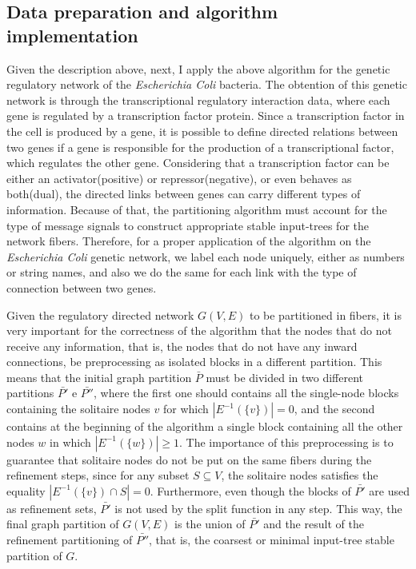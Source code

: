 \documentclass[12pt]{diazessay} %
\begin{document}

\subsection{Data preparation and algorithm implementation}

Given the description above, next, I apply the above algorithm for the genetic regulatory network of the \textit{Escherichia Coli} bacteria. The obtention of this genetic network is through the transcriptional regulatory interaction data, where each gene is regulated by a transcription factor protein. Since a transcription factor in the cell is produced by a gene, it is possible to define directed relations between two genes if a gene is responsible for the production of a transcriptional factor, which regulates the other gene. Considering that a transcription factor can be either an activator(positive) or repressor(negative), or even behaves as both(dual), the directed links between genes can carry different types of information. Because of that, the partitioning algorithm must account for the type of message signals to construct appropriate stable input-trees for the network fibers. Therefore, for a proper application of the algorithm on the \textit{Escherichia Coli} genetic network, we label each node uniquely, either as numbers or string names, and also we do the same for each link with the type of connection between two genes.

Given the regulatory directed network $G(V, E)$ to be partitioned in fibers, it is very important for the correctness of the algorithm that the nodes that do not receive any information, that is, the nodes that do not have any inward connections, be preprocessing as isolated blocks in a different partition. This means that the initial graph partition $\bar{P}$ must be divided in two different partitions $\bar{P'}$ e $\bar{P''}$, where the first one should contains all the single-node blocks containing the solitaire nodes $v$ for which $| E^{-1}(\{v\}) | = 0$, and the second contains at the beginning of the algorithm a single block containing all the other nodes $w$ in which $| E^{-1}(\{w\}) | \geq 1$. The importance of this preprocessing is to guarantee that solitaire nodes do not be put on the same fibers during the refinement steps, since for any subset $S \subseteq V$, the solitaire nodes satisfies the equality $| E^{-1}(\{v\}) \cap S | = 0$. Furthermore, even though the blocks of $\bar{P'}$ are used as refinement sets, $\bar{P'}$ is not used by the split function in any step. This way, the final graph partition of $G(V, E)$ is the union of $\bar{P'}$ and the result of the refinement partitioning of $\bar{P''}$, that is, the coarsest or minimal input-tree stable partition of $G$.
\end{document}
